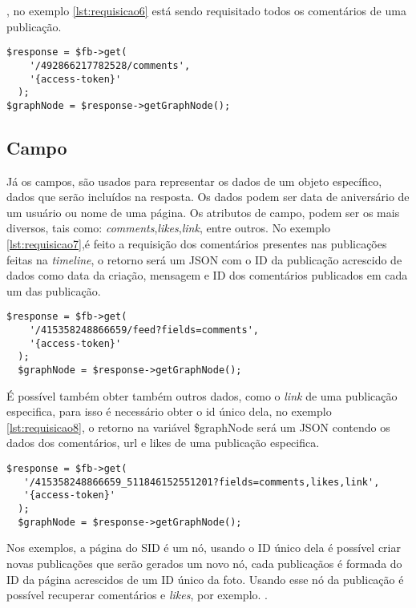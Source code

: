 , no exemplo \ref{lst:requisicao6} está sendo requisitado todos os comentários de uma publicação.

\begin{lstlisting}[caption={Requisitando todos os comentários de uma publicação},label={lst:requisicao6}]
  $response = $fb->get(
    '/492866217782528/comments',
    '{access-token}'
  );
$graphNode = $response->getGraphNode();
\end{lstlisting}

\subsection{Campo}
Já os campos, são usados para representar os dados de um objeto específico, dados que serão incluídos na resposta. Os dados podem ser data de aniversário de um usuário ou nome de uma página. Os atributos de campo, podem ser os mais diversos, tais como: \textit{comments},\textit{likes},\textit{link}, entre outros. No exemplo \ref{lst:requisicao7},é feito a requisição dos comentários presentes nas publicações feitas na \textit{timeline}, o retorno será um JSON com o ID da publicação acrescido de dados como data da criação, mensagem e ID dos comentários publicados em cada um das publicação.

\begin{lstlisting}[caption={Requisitar os comentários de todas as publicações da página},label={lst:requisicao7}]
  $response = $fb->get(
    '/415358248866659/feed?fields=comments',
    '{access-token}' 
  );
  $graphNode = $response->getGraphNode(); 
\end{lstlisting}

É possível também obter também outros dados, como o \textit{link} de uma publicação especifica, para isso é necessário obter o id único dela, no exemplo \ref{lst:requisicao8}, o retorno na variável \$graphNode será um JSON contendo os dados dos comentários, url e likes de uma publicação especifica.

\begin{lstlisting}[caption={Requsição de diversos atributos},label={lst:requisicao8}]
  $response = $fb->get(
   '/415358248866659_511846152551201?fields=comments,likes,link', 
   '{access-token}'
  );
  $graphNode = $response->getGraphNode();
\end{lstlisting}

Nos exemplos, a página do SID é um nó, usando o ID único dela é possível criar novas publicações que serão gerados um novo nó, cada publicaçãos é formada do ID da página acrescidos de um ID único da foto. Usando esse nó da publicação é possível recuperar comentários e \textit{likes}, por exemplo. \cite{facebook2018b}.

